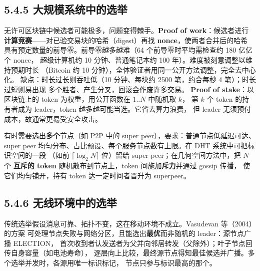 \subsection*{5.4.5 大规模系统中的选举}
无许可区块链中候选者可能极多，问题变得棘手。\textbf{Proof of work}：候选者进行
\textbf{计算竞赛}——对已验交易块的哈希（digest）再找 \textbf{nonce}，使两者合并后的哈希
具有预定数量的前导零。前导零越多越难（64 个前导零时平均需检查约 180 亿亿个 nonce，
超级计算机约 10 分钟、普通笔记本约 100 年）。难度被刻意调整以维持预期时长
（Bitcoin 约 10 分钟），全体验证者用同一公开方法调整，完全去中心化。
缺点：时长过长则吞吐低（10 分钟、每块约 2500 笔，约合每秒 4 笔）；时长过短则易出现
多个胜者、产生分叉，回滚会作废许多交易。
\textbf{Proof of stake}：以区块链上的 token 为权重，用公开函数在 $1..N$ 中随机取 $k$，
第 $k$ 个 token 的持有者成为 leader，token 越多越可能当选。它省去算力浪费，
但 leader 无须预付成本，故通常更易受安全攻击。

\begin{ideabox}
有时需要选出\textbf{多个}节点（如 P2P 中的 super peer），要求：普通节点低延迟可达、
super peer 均匀分布、占比预设、每个服务节点数有上限。在 DHT 系统中可把标识空间的一段
（如前 $\lceil \log_2 N \rceil$ 位）留给 super peer；在几何空间方法中，把 $N$ 个
\textbf{互斥的 token} 随机散布到节点上，token 间施加\textbf{斥力}并通过 gossip 传播，
使它们均匀铺开，持有 token 达一定时间者晋升为 superpeer。
\end{ideabox}

\subsection*{5.4.6 无线环境中的选举}
传统选举假设消息可靠、拓扑不变，这在移动环境不成立。Vasudevan 等（2004）的方案
可处理节点失败与网络分区，且能选出\textbf{最优}而非随机的 leader：源节点广播 ELECTION，
首次收到者认发送者为父并向邻居转发（父除外）；叶子节点回传自身容量（如电池寿命），
逐层向上比较，最终源节点得知最佳候选并广播。多个选举并发时，各源用唯一标识标记，
节点只参与标识最高的那个。

\begin{closeread}
\end{closeread}

